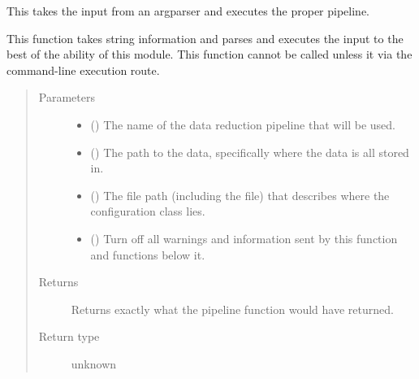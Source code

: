 \documentclass[letterpaper,10pt,english]{sphinxmanual}
\begin{document}
\begin{fulllineitems}
\label{\detokenize{python_docstrings/IfA_Smeargle.ifas_execute:IfA_Smeargle.ifas_execute.execute_ifas_smeargle}}
This takes the input from an argparser and executes the proper
pipeline.

This function takes string information and parses and executes the input
to the best of the ability of this module. This function cannot be called
unless it via the command-line execution route.
\begin{quote}\begin{description}
\item[{Parameters}] \leavevmode\begin{itemize}
\item {} 
 () \textendash{} The name of the data reduction pipeline that will be used.

\item {} 
 () \textendash{} The path to the data, specifically where the data is all stored in.

\item {} 
 () \textendash{} The file path (including the file) that describes where the
configuration class lies.

\item {} 
 (\sphinxstyleliteralemphasis{\sphinxupquote{ (}}\sphinxstyleliteralemphasis{\sphinxupquote{)}}) \textendash{} Turn off all warnings and information sent by this function and
functions below it.

\end{itemize}

\item[{Returns}] \leavevmode
{} \textendash{} Returns exactly what the pipeline function would have returned.

\item[{Return type}] \leavevmode
unknown

\end{description}\end{quote}

\end{fulllineitems}
\end{document}
